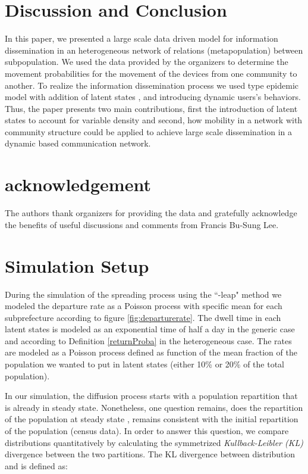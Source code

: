 \documentclass[review]{elsarticle}
\begin{document}
\section{Discussion and Conclusion}\label{sec:conclusion}

In this paper, we presented a large scale data driven model for information dissemination in an heterogeneous network of relations (metapopulation) between subpopulation. We used the data provided by the  organizers to determine the movement probabilities for the movement of the devices from one community to another. To realize the information dissemination process we used  type epidemic model with addition of latent states ,  and  introducing dynamic users's behaviors. Thus, the paper presents two main contributions, first the introduction of latent states to account for variable density and second, how mobility in a network with community structure could be applied to achieve large scale dissemination in a dynamic  based communication network.

\section{acknowledgement}\label{sec:acknowledgement}
The authors thank  organizers for providing the data and gratefully acknowledge the benefits of useful discussions and comments from Francis Bu-Sung Lee.

\appendix
\section{Simulation Setup}\label{AppendixA}

During the simulation of the spreading process using the ``-leap" method we modeled the departure rate as a Poisson process with specific mean for each subprefecture according to figure \ref{fig:departurerate}. The dwell time  in each latent states is modeled as an exponential time of half a day in the generic case and according to Definition \ref{returnProba} in the heterogeneous case. The rates  are modeled as a Poisson process defined as function of the mean fraction of the population we wanted to put in latent states (either 10\% or 20\% of the total population). 

In our simulation, the diffusion process starts with a population repartition that is already in steady state. Nonetheless, one question remains, does the repartition of the population at steady state , remains consistent with the initial repartition of the population  (census data). In order to answer this question, we compare distributions quantitatively by calculating the symmetrized \textit{Kullback\hyp{}Leibler (KL)} divergence between the two partitions. The KL divergence between distribution  and  is defined as:
\end{document}
